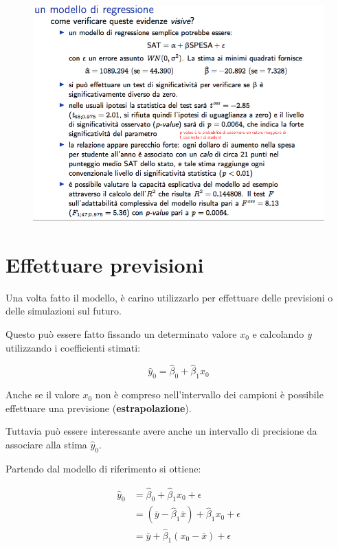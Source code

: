 \begin{figure}[htbp]
	\centering
	\includegraphics[width=1\textwidth]{./notes/immagini/l8-bonus.png}
\end{figure}

\section{Effettuare previsioni}\label{effettuare-previsioni}

Una volta fatto il modello, è carino utilizzarlo per effettuare delle
previsioni o delle simulazioni sul futuro.

Questo può essere fatto fissando un determinato valore $ x_0 $ e calcolando \textit{y} utilizzando i coefficienti stimati:

$$
\hat{y}_0 = \hat{\beta}_0 + \hat{\beta}_1 x_0
$$

Anche se il valore $ x_0 $ non è compreso nell'intervallo dei campioni è possibile effettuare una previsione (\textbf{estrapolazione}).

Tuttavia può essere interessante avere anche un intervallo di precisione da associare alla stima $ \hat{y}_0 $.

Partendo dal modello di riferimento si ottiene:

\begin{align*}
	\hat{y}_0 &= \hat{\beta}_0 + \hat{\beta}_1 x_0 + \epsilon \\
					&= (\bar{y} - \hat{\beta}_1 \bar{x}) + \hat{\beta}_1 x_0 + \epsilon \\
					&= \bar{y} + \hat{\beta}_1(x_0 - \bar{x}) + \epsilon 
\end{align*}


